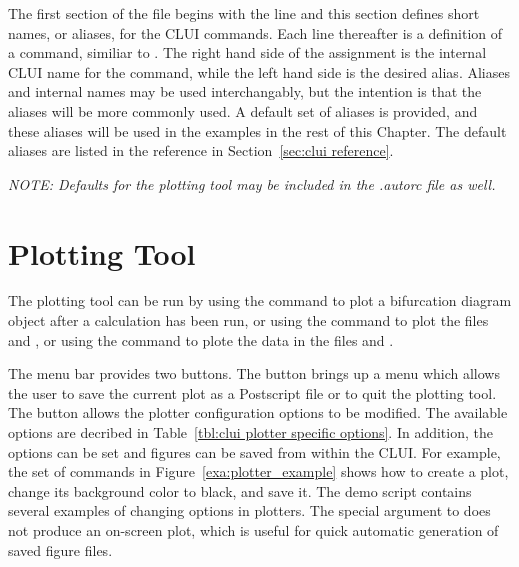 \documentclass[12pt]{report}
\begin{document}
 The first section of the  file
 begins with the line 
 and this section defines short names, or aliases,
 for the \AUTO CLUI commands.  
 Each line thereafter is a definition of
 a command, similiar to 
 .
 The right hand side of the assignment
 is the internal \AUTO CLUI name for the command,
 while the left hand side is the desired alias.  
 Aliases and
 internal names may be used interchangably, but the
 intention is that the aliases will be more commonly
 used.  A default set of aliases is provided, and
 these aliases will be used in the examples in the
 rest of this Chapter.  The default aliases
 are listed in the reference in Section~\ref{sec:clui reference}.

 {\em NOTE:  Defaults for the plotting tool may be included in
 the .autorc file as well.}

 \section{ Plotting Tool}\label{clui:plotting}

 The plotting tool can be run by using the command
  to plot a bifurcation diagram object 
 after a calculation has been run, or using the command
  to plot the files  and ,
 or using the command  to plote the data in the
 files  and .  

 The menu bar provides two buttons.  The 
 button brings up a menu which allows the user to save
 the current plot as a Postscript file or
 to quit the plotting tool.
 The  button allows the plotter
 configuration options to be modified.
 The available options are decribed in
 Table~\ref{tbl:clui plotter specific options}.  In addition, the options can 
 be set and figures can be saved from within the CLUI.  For example,
 the set of commands in Figure~\ref{exa:plotter_example} shows how to
 create a plot, change its background color to black, and save it.  The
 demo script  contains several
 examples of changing options in plotters. 
 The special argument 
  to  does not produce an on-screen
 plot, which is useful for quick automatic generation of saved figure files.
\end{document}
